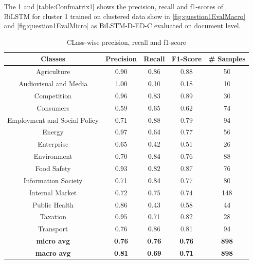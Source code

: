 The \ref{tab:precisionRecallF1Score} and \ref{table:Confmatrix1} shows the precision, recall and f1-scores of \gls{BiLSTM} for cluster 1 trained on clustered data show in \ref{fig:question1EvalMacro} and \ref{fig:question1EvalMicro} as BiLSTM-D-ED-C evaluated on document level.

\begin{table}[!ht]
\centering
\begin{tabular}{ccccc}
\textbf{Classes} & \textbf{Precision} & \textbf{Recall} & \textbf{F1-Score} & \textbf{\# Samples} \\ \hline
Agriculture & 0.90 & 0.86 & 0.88 & 50 \\
Audiovisual and Media & 1.00 & 0.10 & 0.18 & 10 \\
Competition & 0.96 & 0.83 & 0.89 & 30 \\
Consumers & 0.59 & 0.65 & 0.62 & 74 \\
Employment and Social Policy & 0.71 & 0.88 & 0.79 & 94 \\
Energy & 0.97 & 0.64 & 0.77 & 56 \\
Enterprise & 0.65 & 0.42 & 0.51 & 26 \\
Environment & 0.70 & 0.84 & 0.76 & 88 \\
Food Safety & 0.93 & 0.82 & 0.87 & 76 \\
Information Society & 0.71 & 0.84 & 0.77 & 80 \\
Internal Market & 0.72 & 0.75 & 0.74 & 148 \\
Public Health & 0.86 & 0.43 & 0.58 & 44 \\
Taxation & 0.95 & 0.71 & 0.82 & 28 \\
Transport & 0.76 & 0.86 & 0.81 & 94 \\ \hline
\textbf{micro avg} & \textbf{0.76} & \textbf{0.76} & \textbf{0.76} & \textbf{898} \\
\textbf{macro avg }& \textbf{0.81} & \textbf{0.69} & \textbf{0.71} & \textbf{898} \\ \hline
\end{tabular}
\captionsetup{justification=centering,margin=1cm}
\caption{CLass-wise precision, recall and f1-score}
\label{tab:precisionRecallF1Score}
\end{table}



